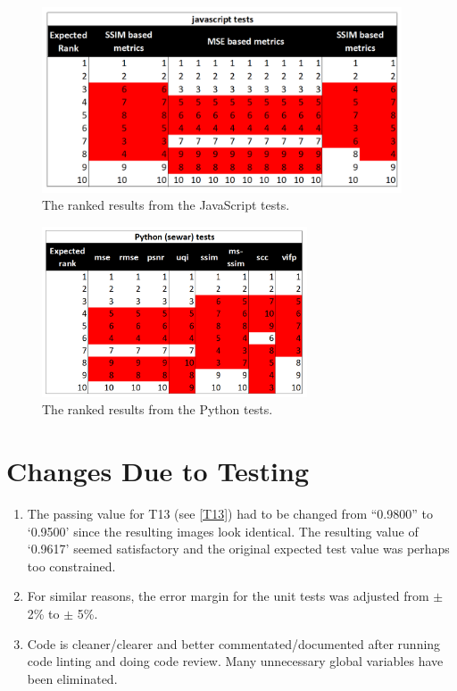 \documentclass[12pt, titlepage]{article}
\begin{document}
\begin{figure}[h!]
  \begin{center}
  \includegraphics[width=0.95\textwidth]{test-analysis/js-ranked.png}
  \caption{The ranked results from the JavaScript tests.}
  \label{fig_js_ranks}
  \end{center}
\end{figure}

\begin{figure}[h!]
  \begin{center}
  \includegraphics[width=0.7\textwidth]{test-analysis/py-ranked.png}
  \caption{The ranked results from the Python tests.}
  \label{fig_py_ranks}
  \end{center}
\end{figure}


\newpage
\clearpage

\section{Changes Due to Testing}
\begin{enumerate}
  \item The passing value for T13 (see \ref{T13}) had to be changed from ``0.9800'' to `0.9500' since the
    resulting images look identical. The resulting value of `0.9617' seemed satisfactory and the original
    expected test value was perhaps too constrained.
  \item For similar reasons, the error margin for the unit tests was adjusted from $\pm$ 2\% to $\pm$ 5\%.
  \item Code is cleaner/clearer and better commentated/documented after running code linting and
    doing code review. Many unnecessary global variables have been eliminated.
\end{enumerate}
\end{document}
